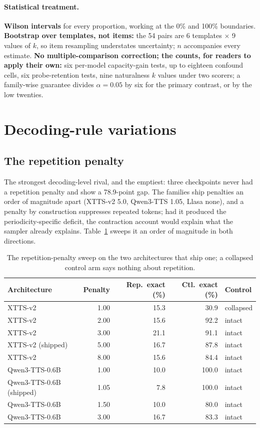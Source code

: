 \paragraph{Statistical treatment.} \textbf{Wilson intervals} for every proportion, working at
the 0\% and 100\% boundaries. \textbf{Bootstrap over templates, not items:} the 54 pairs are 6
templates $\times$ 9 values of $k$, so item resampling understates uncertainty; $n$ accompanies
every estimate. \textbf{No multiple-comparison correction; the counts, for readers to apply
their own:} six per-model capacity-gain tests, up to eighteen confound cells, six
probe-retention tests, nine naturalness $k$ values under two scorers; a family-wise guarantee
divides $\alpha{=}0.05$ by six for the primary contrast, or by the low twenties.


\section{Decoding-rule variations}
\label{sec:decoding}
\subsection{The repetition penalty}
\label{sec:penalty}

The strongest decoding-level rival, and the emptiest: three checkpoints never had a repetition
penalty and show a 78.9-point gap. The families ship penalties an order of magnitude apart
(XTTS-v2 5.0, Qwen3-TTS 1.05, Llasa none), and a penalty by construction suppresses repeated
tokens; had it produced the periodicity-specific deficit, the contraction account would explain what the
sampler already explains. Table~\ref{tab:penaltysweep} sweeps it an order of
magnitude in both directions.

\begin{table}[tp]\centering
\caption{The repetition-penalty sweep on the two architectures that ship one; a collapsed control arm says nothing about repetition.}
\label{tab:penaltysweep}
\begin{tabular}{@{}lrrrl@{}}
\toprule
Architecture & Penalty & Rep.\ exact (\%) & Ctl.\ exact (\%) & Control \\
\midrule
XTTS-v2 & 1.00 & 15.3 & 30.9 & collapsed \\
XTTS-v2 & 2.00 & 15.6 & 92.2 & intact \\
XTTS-v2 & 3.00 & 21.1 & 91.1 & intact \\
XTTS-v2 (shipped) & 5.00 & 16.7 & 87.8 & intact \\
XTTS-v2 & 8.00 & 15.6 & 84.4 & intact \\
Qwen3-TTS-0.6B & 1.00 & 10.0 & 100.0 & intact \\
Qwen3-TTS-0.6B (shipped) & 1.05 & 7.8 & 100.0 & intact \\
Qwen3-TTS-0.6B & 1.50 & 10.0 & 80.0 & intact \\
Qwen3-TTS-0.6B & 3.00 & 16.7 & 83.3 & intact \\
\bottomrule
\end{tabular}
\end{table}

